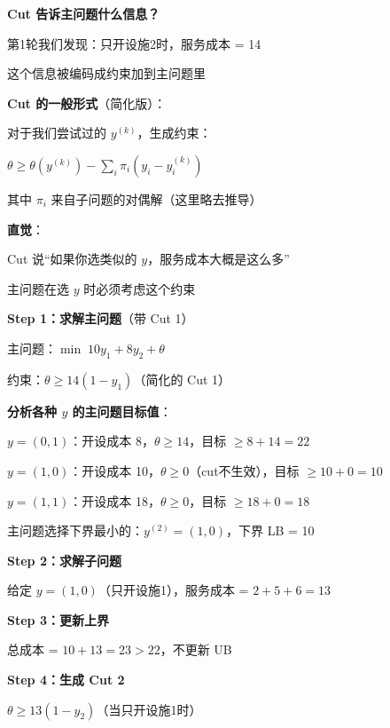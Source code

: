 \documentclass[12pt, a4paper]{ctexart}
\begin{document}
\begin{blackboard}

\textbf{Cut 告诉主问题什么信息？}

第1轮我们发现：只开设施2时，服务成本 = 14

这个信息被编码成约束加到主问题里

\textbf{Cut 的一般形式}（简化版）：

对于我们尝试过的 $y^{(k)}$，生成约束：

$\theta \geq \theta(y^{(k)}) - \sum_i \pi_i (y_i - y_i^{(k)})$

其中 $\pi_i$ 来自子问题的对偶解（这里略去推导）

\textbf{直觉}：

Cut 说``如果你选类似的 $y$，服务成本大概是这么多''

主问题在选 $y$ 时必须考虑这个约束

\end{blackboard}

\begin{blackboard}[Benders 迭代：第2轮]

\textbf{Step 1：求解主问题}（带 Cut 1）

主问题：$\min \; 10 y_1 + 8 y_2 + \theta$

约束：$\theta \geq 14(1 - y_1)$（简化的 Cut 1）

\textbf{分析各种 $y$ 的主问题目标值}：

$y = (0, 1)$：开设成本 8，$\theta \geq 14$，目标 $\geq 8 + 14 = 22$

$y = (1, 0)$：开设成本 10，$\theta \geq 0$（cut不生效），目标 $\geq 10 + 0 = 10$

$y = (1, 1)$：开设成本 18，$\theta \geq 0$，目标 $\geq 18 + 0 = 18$

主问题选择下界最小的：$y^{(2)} = (1, 0)$，下界 LB = 10

\textbf{Step 2：求解子问题}

给定 $y = (1, 0)$（只开设施1），服务成本 = $2 + 5 + 6 = 13$

\textbf{Step 3：更新上界}

总成本 = $10 + 13 = 23 > 22$，不更新 UB

\textbf{Step 4：生成 Cut 2}

$\theta \geq 13(1 - y_2)$（当只开设施1时）

\end{blackboard}
\end{document}
